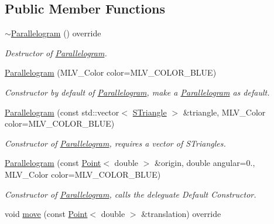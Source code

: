 \subsection*{Public Member Functions}
\begin{DoxyCompactItemize}
\item 
\mbox{\label{classParallelogram_ae3c14e58b92406f4679234817313a26c}} 
\hyperlink{classParallelogram_ae3c14e58b92406f4679234817313a26c}{$\sim$\+Parallelogram} () override
\begin{DoxyCompactList}\small\item\em Destructor of \hyperlink{classParallelogram}{Parallelogram}. \end{DoxyCompactList}\item 
\hyperlink{classParallelogram_a2200aa50be9b13ccb40a371a3d2b119b}{Parallelogram} (M\+L\+V\+\_\+\+Color color=M\+L\+V\+\_\+\+C\+O\+L\+O\+R\+\_\+\+B\+L\+UE)
\begin{DoxyCompactList}\small\item\em Constructor by default of \hyperlink{classParallelogram}{Parallelogram}, make a \hyperlink{classParallelogram}{Parallelogram} as default. \end{DoxyCompactList}\item 
\hyperlink{classParallelogram_ac60d6fc9e306b202e9c679d170d6d063}{Parallelogram} (const std\+::vector$<$ \hyperlink{classSTriangle}{S\+Triangle} $>$ \&triangle, M\+L\+V\+\_\+\+Color color=M\+L\+V\+\_\+\+C\+O\+L\+O\+R\+\_\+\+B\+L\+UE)
\begin{DoxyCompactList}\small\item\em Constructor of \hyperlink{classParallelogram}{Parallelogram}, requires a vector of S\+Triangles. \end{DoxyCompactList}\item 
\hyperlink{classParallelogram_aeed0c83e942a4869b79d4baab00c2874}{Parallelogram} (const \hyperlink{classPoint}{Point}$<$ double $>$ \&origin, double angular=0., M\+L\+V\+\_\+\+Color color=M\+L\+V\+\_\+\+C\+O\+L\+O\+R\+\_\+\+B\+L\+UE)
\begin{DoxyCompactList}\small\item\em Constructor of \hyperlink{classParallelogram}{Parallelogram}, calls the deleguate Default Constructor. \end{DoxyCompactList}\item 
void \hyperlink{classParallelogram_ae8d51f9b629160df31c8a12c28da279e}{move} (const \hyperlink{classPoint}{Point}$<$ double $>$ \&translation) override

\end{DoxyCompactItemize}
